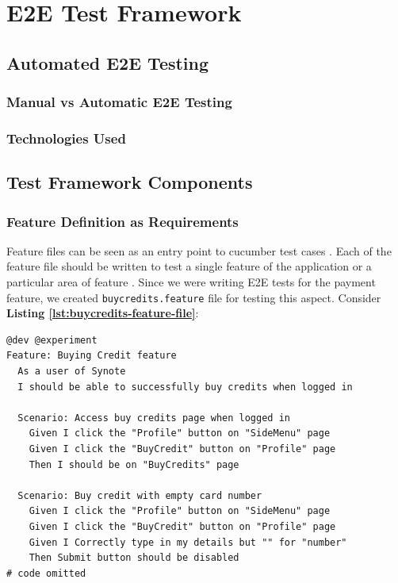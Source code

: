 \chapter{E2E Test Framework}
\label{chap:e2e-test-framework}

\section{Automated E2E Testing}
\label{sec:automated-e2e-testing}

\subsection{Manual vs Automatic E2E Testing}
\label{sec:manual-vs-automatic-e2e-testing}

\subsection{Technologies Used}
\label{sec:technologies-used}

\section{Test Framework Components}
\label{sec:test-framework-components}

\subsection{Feature Definition as Requirements}
\label{subsec:feautre-definition-as-requirements}

Feature files can be seen as an entry point to cucumber test cases \cite{featurefile1}. Each of the feature file should be written to test a single feature of the application or a particular area of feature \cite{featurefile2}. Since we were writing E2E tests for the payment feature, we created \texttt{buycredits.feature} file for testing this aspect. Consider \textbf{Listing \ref{lst:buycredits-feature-file}}:\\

\begin{listing}[H]
\begin{verbatim}
@dev @experiment
Feature: Buying Credit feature
  As a user of Synote
  I should be able to successfully buy credits when logged in

  Scenario: Access buy credits page when logged in
    Given I click the "Profile" button on "SideMenu" page
    Given I click the "BuyCredit" button on "Profile" page
    Then I should be on "BuyCredits" page

  Scenario: Buy credit with empty card number
    Given I click the "Profile" button on "SideMenu" page
    Given I click the "BuyCredit" button on "Profile" page
    Given I Correctly type in my details but "" for "number"
    Then Submit button should be disabled
# code omitted
\end{verbatim}
\label{lst:buycredits-feature-file}
\end{listing}

